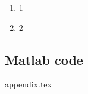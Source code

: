 \documentclass[oneside]{article}
\begin{document}
	\begin{enumerate}
		\item {1}
		\item {2}
	\end{enumerate}
	\begin{appendices}
		\section{Matlab code}
		{appendix.tex}
	\end{appendices}
\end{document}
